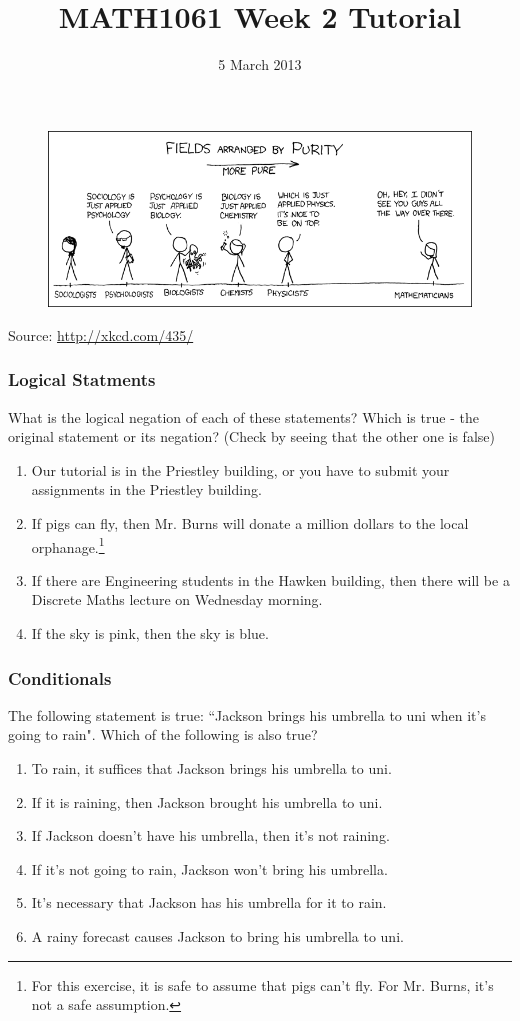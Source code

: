 \documentclass{beamer}
\title{MATH1061 Week 2 Tutorial}
\date{5 March 2013}
\begin{document}
\frame{\titlepage}

\begin{frame}
\begin{figure}
\centering
\includegraphics[width=\textwidth]{src/purity.png}
\end{figure}
{\tiny Source: \url{http://xkcd.com/435/}}
\end{frame}

\begin{frame}
\frametitle{Logical Statments}

What is the logical negation of each of these statements?
Which is true - the original statement or its negation? (Check by seeing that
the other one is false)

\begin{enumerate}
\item Our tutorial is in the Priestley building, or you have to submit
your assignments in the Priestley building.
\item If pigs can fly, then Mr. Burns will donate a million dollars to the
local orphanage.\footnote{For this exercise, it is safe to assume that pigs
can't fly. For Mr. Burns, it's not a safe assumption.}
\item If there are Engineering students in the Hawken building, then there will
be a Discrete Maths lecture on Wednesday morning.
\item If the sky is pink, then the sky is blue.
\end{enumerate}

\end{frame}

\begin{frame}
\frametitle{Conditionals}

The following statement is true: ``Jackson brings his umbrella to uni when it's
going to rain". Which of the following is also true?

\begin{enumerate}
\item To rain, it suffices that Jackson brings his umbrella to uni.
\item If it is raining, then Jackson brought his umbrella to uni.
\item If Jackson doesn't have his umbrella, then it's not raining.
\item If it's not going to rain, Jackson won't bring his umbrella.
\item It's necessary that Jackson has his umbrella for it to rain.
\item A rainy forecast causes Jackson to bring his umbrella to uni.
\end{enumerate}

\end{frame}
\end{document}
